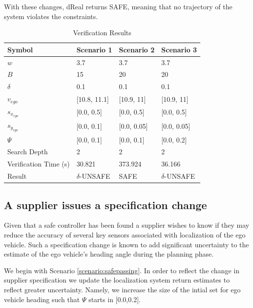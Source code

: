 With these changes, dReal returns SAFE, meaning that no trajectory of the system violates the constraints.

\begin{table}[]
	\centering
	\caption{Verification Results}
	\begin{tabular}{|l|l|l|l|}
		\hline
		Symbol & Scenario 1 & Scenario 2 & Scenario 3 \\ \hline
		$w$ & 3.7 & 3.7 & 3.7 \\ \hline
		$B$ & 15 & 20 & 20 \\ \hline
		$\delta$ & 0.1 & 0.1 & 0.1 \\ \hline
		$v_{ego}$ & [10.8, 11.1] & [10.9, 11] & [10.9, 11] \\ \hline
		$s_{x_{ego}}$ & [0.0, 0.5] & [0.0, 0.5] & [0.0, 0.5] \\ \hline
		$s_{y_{ego}}$ & [0.0, 0.1] & [0.0, 0.05] & [0.0, 0.05] \\ \hline
		$\Psi$ & [0.0, 0.1] & [0.0, 0.1] & [0.0, 0.2] \\ \hline
		Search Depth & 2 & 2 & 2 \\ \hline
		Verification Time (s) & 30.821 & 373.924 & 36.166 \\ \hline
		Result & $\delta$-UNSAFE & SAFE & $\delta$-UNSAFE \\ \hline
	\end{tabular}
	\label{table:vresults}
\end{table}

\subsection{A supplier issues a specification change}
Given that a safe controller has been found a supplier wishes to know if they may reduce the accuracy of several key sensors associated with localization of the ego vehicle. Such a specification change is known to add significant uncertainty to the estimate of the ego vehicle's heading angle during the planning phase. 

\begin{scenario}
	\label{scenario:perception}
	We begin with Scenario \ref{scenario:safepassing}.
	In order to reflect the change in supplier specification we update the localization system return estimates to reflect greater uncertainty. 
	Namely, we increase the size of the intial set for ego vehicle heading such that $\Psi$ starts in [0.0,0.2].\\
\end{scenario}

